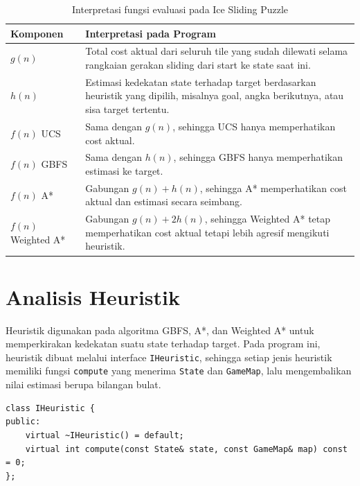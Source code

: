 \begin{table}[H]
	\centering
	\caption{Interpretasi fungsi evaluasi pada Ice Sliding Puzzle}
	\begin{tabular}{|p{3.5cm}|p{10.5cm}|}
		\hline
		\rowcolor{gray!25}
		\textbf{Komponen} & \textbf{Interpretasi pada Program} \\
		\hline
		$g(n)$ & Total cost aktual dari seluruh tile yang sudah dilewati selama rangkaian gerakan sliding dari start ke state saat ini. \\
		\hline
		$h(n)$ & Estimasi kedekatan state terhadap target berdasarkan heuristik yang dipilih, misalnya goal, angka berikutnya, atau sisa target tertentu. \\
		\hline
		$f(n)$ UCS & Sama dengan $g(n)$, sehingga UCS hanya memperhatikan cost aktual. \\
		\hline
		$f(n)$ GBFS & Sama dengan $h(n)$, sehingga GBFS hanya memperhatikan estimasi ke target. \\
		\hline
		$f(n)$ A* & Gabungan $g(n)+h(n)$, sehingga A* memperhatikan cost aktual dan estimasi secara seimbang. \\
		\hline
		$f(n)$ Weighted A* & Gabungan $g(n)+2h(n)$, sehingga Weighted A* tetap memperhatikan cost aktual tetapi lebih agresif mengikuti heuristik. \\
		\hline
	\end{tabular}
\end{table}

\section{Analisis Heuristik}

Heuristik digunakan pada algoritma GBFS, A*, dan Weighted A* untuk memperkirakan kedekatan suatu state terhadap target. 
Pada program ini, heuristik dibuat melalui interface \texttt{IHeuristic}, sehingga setiap jenis heuristik memiliki fungsi \texttt{compute} yang menerima \texttt{State} dan \texttt{GameMap}, lalu mengembalikan nilai estimasi berupa bilangan bulat.

\begin{tcolorbox}[
	colback=orange!5,
	colframe=orange!70!black,
	title=\textbf{Interface Heuristik},
	arc=2mm,
	boxrule=0.8pt
]
\small
\begin{verbatim}
class IHeuristic {
public:
    virtual ~IHeuristic() = default;
    virtual int compute(const State& state, const GameMap& map) const = 0;
};
\end{verbatim}
\end{tcolorbox}

